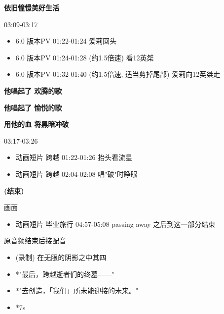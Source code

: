 \documentclass[a4paper]{article}
\begin{document}
\textbf{依旧憧憬美好生活}

03:09-03:17

\begin{itemize}
    \item 6.0 版本PV 01:22-01:24 爱莉回头
    \item 6.0 版本PV 01:24-01:28 (约1.5倍速) 看12英桀
    \item 6.0 版本PV 01:32-01:40 (约1.5倍速, 适当剪掉尾部) 爱莉向12英桀走
\end{itemize}

\textbf{他唱起了 欢腾的歌}

\textbf{他唱起了 愉悦的歌}

\textbf{用他的血 将黑暗冲破}

03:17-03:26

\begin{itemize}
    \item 动画短片 跨越 01:22-01:26 抬头看流星
    \item 动画短片 跨越 02:04-02:08 唱"破"时睁眼
\end{itemize}

\textbf{(结束)}

画面

\begin{itemize}
    \item 动画短片 毕业旅行 04:57-05:08 passing away 之后到这一部分结束
\end{itemize}

原音频结束后接配音

\begin{itemize}
    \item (录制) 在无限的阴影之中其四
    \item *"最后，跨越逝者们的终墓——"
    \item *"去创造，「我们」所未能迎接的未来。"
    \item *7s
\end{itemize}

\end{document}
